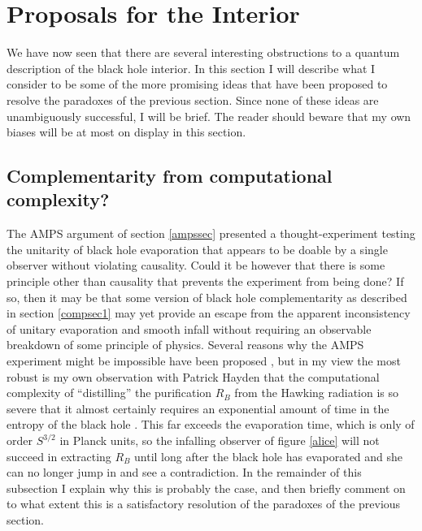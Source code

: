 \documentclass[12pt]{article}
\begin{document}
\section{Proposals for the Interior}\label{altsec}
We have now seen that there are several interesting obstructions to a quantum description of the black hole interior. In this section I will describe what I consider to be some of the more promising ideas that have been proposed to resolve the paradoxes of the previous section.  Since none of these ideas are unambiguously successful, I will be brief.  The reader should beware that my own biases will be at most on display in this section.  

\subsection{Complementarity from computational complexity?}\label{savecomp}
The AMPS argument of section \ref{ampssec} presented a thought-experiment testing the unitarity of black hole evaporation that appears to be doable by a single observer without violating causality.  Could it be however that there is some principle other than causality that prevents the experiment from being done?  If so, then it may be that some version of black hole complementarity as described in section \ref{compsec1} may yet provide an escape from the apparent inconsistency of unitary evaporation and smooth infall without requiring an observable breakdown of some principle of physics.  Several reasons why the AMPS experiment might be impossible have been proposed \cite{harlow2,Hui:2013jfa,Ilgin:2013iba,Freivogel:2014fqa}, but in my view the most robust is my own observation with Patrick Hayden that the computational complexity of ``distilling'' the purification $R_B$ from the Hawking radiation is so severe that it almost certainly requires an exponential amount of time in the entropy of the black hole \cite{Harlow:2013tf}.  This far exceeds the evaporation time, which is only of order $S^{3/2}$ in Planck units, so the infalling observer of figure \ref{alice} will not succeed in extracting $R_B$ until long after the black hole has evaporated and she can no longer jump in and see a contradiction.  In the remainder of this subsection I explain why this is probably the case, and then briefly comment on to what extent this is a satisfactory resolution of the paradoxes of the previous section.
\end{document}
